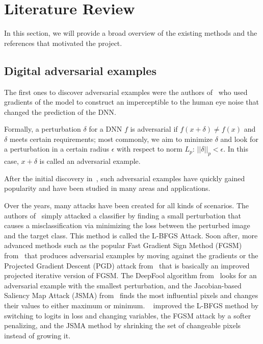 
\chapter{Literature Review}

In this section, we will provide a broad overview of the existing methods and the references that motivated the project.

\section{Digital adversarial examples}
The first ones to discover adversarial examples were the authors of~\cite{first_adv} who used gradients of the model to construct an imperceptible to the human eye noise that changed the prediction of the DNN.

Formally, a perturbation $\delta$ for a DNN $f$ is adversarial if $f(x+\delta) \ne f(x)$ and $\delta$ meets certain requirements; most commonly, we aim to minimize $\delta$ and look for a perturbation in a certain radius $\epsilon$ with respect to norm $L_{p}$: $||\delta||_p < \epsilon$.
In this case, $x + \delta$ is called an adversarial example.

After the initial discovery in~\cite{first_adv}, such adversarial examples have quickly gained popularity and have been studied in many areas and applications.

Over the years, many attacks have been created for all kinds of scenarios.
The authors of~\cite{first_adv} simply attacked a classifier by finding a small perturbation that causes a misclassification via minimizing the loss between the perturbed image and the target class.
This method is called the L-BFGS Attack.
Soon after, more advanced methods such as the popular Fast Gradient Sign Method (FGSM) from~\cite{fgsm} that produces adversarial examples by moving against the gradients or the Projected Gradient Descent (PGD) attack from~\cite{pgd} that is basically an improved projected iterative version of FGSM.
The DeepFool algorithm from~\cite{deepfool} looks for an adversarial example with the smallest perturbation, and the Jacobian-based Saliency Map Attack (JSMA) from~\cite{jsma} finds the most influential pixels and changes their values to either maximum or minimum.
~\cite{carlini_attacks} improved the L-BFGS method by switching to logits in loss and changing variables, the FGSM attack by a softer penalizing, and the JSMA method by shrinking the set of changeable pixels instead of growing it.

